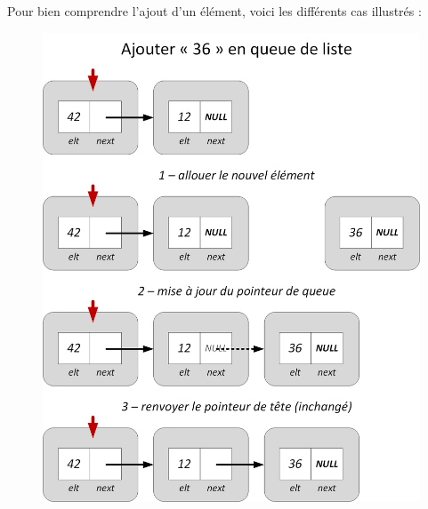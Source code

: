 \documentclass[11pt,a4paper]{article}
\begin{document}
\bigskip

Pour bien comprendre l'ajout d'un élément, voici les différents cas illustrés :

\vfillFirst

\begin{figure}[ht!]
\centering
\centerline{   %
\includegraphics[scale=0.85]{img/listes/Listes_Pointeurs_3_1_ajout_queue.png}
}
\end{figure}

\vfillLast

\clearpage

\vfillFirst
\end{document}
